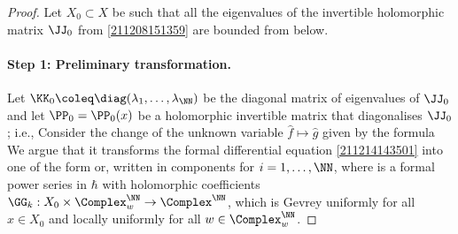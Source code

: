 \documentclass[11pt]{article}
\begin{document}
\begin{proof}
Let $X_0 \subset X$ be such that all the eigenvalues of the invertible holomorphic matrix $\JJ_0$ from \eqref{211208151359} are bounded from below.

\paragraph*{Step 1: Preliminary transformation.}
\label{220110161323}
Let $\KK_0 \coleq \diag (\lambda_1, \ldots, \lambda_\NN)$ be the diagonal matrix of eigenvalues of $\JJ_0$ and let $\PP_0 = \PP_0 (x)$ be a holomorphic invertible matrix that diagonalises $\JJ_0$; i.e., 
Consider the change of the unknown variable $\hat{f} \mapsto \hat{g}$ given by the formula
We argue that it transforms the formal differential equation \eqref{211214143501} into one of the form
or, written in components for $i = 1, \ldots, \NN$,
where
is a formal power series in $\hbar$ with holomorphic coefficients $\GG_k : X_0 \times \Complex_w^\NN \to \Complex^\NN$, which is Gevrey uniformly for all $x \in X_0$ and locally uniformly for all $w \in \Complex^\NN_w$.


\end{proof}
\end{document}
